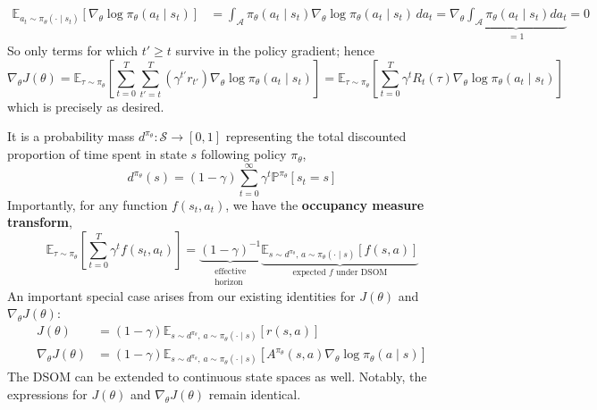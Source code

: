 \documentclass[11pt, letterpaper]{article}
\begin{document}
\begin{remark}
\begin{align*}
        \mathbb{E}_{a_t \sim \pi_\theta(\cdot \mid s_t)}[\nabla_\theta \log \pi_\theta(a_t \mid s_t)]
        &= \int_{\mathcal{A}} \pi_\theta(a_t \mid s_t) \nabla_\theta \log \pi_\theta(a_t \mid s_t) \, da_t 
        = \nabla_\theta \underbrace{\int_{\mathcal{A}} \pi_\theta(a_t \mid s_t) da_t}_{=1}
        = 0
    \end{align*}
    So only terms for which \(t' \geq t\) survive in the policy gradient; hence
    \[
        \nabla_\theta J(\theta) 
        = \mathbb{E}_{\tau \sim \pi_\theta} \left[ \sum_{t=0}^T \sum_{t'=t}^T \left(\gamma^{t'} r_{t'}\right) \nabla_\theta \log \pi_\theta(a_t \mid s_t) \right]
        = \mathbb{E}_{\tau \sim \pi_\theta} \left[\sum_{t=0}^T \gamma^t R_t(\tau) \nabla_\theta \log \pi_\theta(a_t \mid s_t)\right]
    \]
    which is precisely as desired. 
\end{remark}

\begin{concept}
    It is a probability mass \(d^{\pi_\theta} : \mathcal{S} \to [0,1]\) representing the total discounted proportion of time spent in state \(s\) following policy \(\pi_\theta\), 
    \[
        d^{\pi_\theta}(s) 
        = (1 - \gamma) \sum_{t=0}^\infty \gamma^t \mathbb{P}^{\pi_\theta}[s_t = s]
    \]
    Importantly, for any function \(f(s_t, a_t)\), we have the \textbf{occupancy measure transform}, 
    \[
        \mathbb{E}_{\tau \sim \pi_\theta}\left[ \sum_{t=0}^T \gamma^t f(s_t, a_t) \right]
        = \underbrace{(1 - \gamma)^{-1}}_{\substack{\text{effective} \\ \text{horizon}}} \underbrace{\mathbb{E}_{s \sim d^{\pi_\theta},\, a \sim \pi_\theta(\cdot \mid s)} [f(s,a)]}_{\text{expected } f \text{ under  DSOM}}
    \]
    An important special case arises from our existing identities for \(J(\theta)\) and \(\nabla_\theta J(\theta)\): 
    \begin{align*}
        J(\theta) &= (1 - \gamma) \mathbb{E}_{s \sim d^{\pi_\theta},\, a \sim \pi_\theta(\cdot \mid s)}[r(s, a)] \\
        \nabla_\theta J(\theta) &= (1 - \gamma) \mathbb{E}_{s \sim d^{\pi_\theta},\, a \sim \pi_\theta(\cdot \mid s)}[A^{\pi_\theta}(s, a) \nabla_\theta \log \pi_\theta(a \mid s)]
    \end{align*}
    The DSOM can be extended to continuous state spaces as well. Notably, the expressions for \(J(\theta)\) and \(\nabla_\theta J(\theta)\) remain identical. 
\end{concept}
\end{document}
